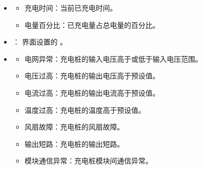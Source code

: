 \documentclass[a4paper,11pt,english,openany,oneside]{sphinxmanual}
\begin{document}
\begin{itemize}
\begin{itemize}
\item {} 
\sphinxAtStartPar
最大电流：默认为30A，也可以在  界面设置  值。

\item {} 
\sphinxAtStartPar
充电电压：当前充电的电压值。

\item {} 
\sphinxAtStartPar
充电电流：当前充电的电流值。

\end{itemize}

\item {} 
\sphinxAtStartPar
{}
\begin{itemize}
\item {} 
\sphinxAtStartPar
充电时间：当前已充电时间。

\item {} 
\sphinxAtStartPar
电量百分比：已充电量占总电量的百分比。

\end{itemize}

\item {} 
\sphinxAtStartPar
{} ：  界面设置的 。

\item {} 
\sphinxAtStartPar
{}
\begin{itemize}
\item {} 
\sphinxAtStartPar
电网异常：充电桩的输入电压高于或低于输入电压范围。

\item {} 
\sphinxAtStartPar
电压过高：充电桩的输出电压高于预设值。

\item {} 
\sphinxAtStartPar
电流过高：充电桩的输出电流高于预设值。

\item {} 
\sphinxAtStartPar
温度过高：充电桩的温度高于预设值。

\item {} 
\sphinxAtStartPar
风扇故障：充电桩的风扇故障。

\item {} 
\sphinxAtStartPar
输出短路：充电桩的输出短路。

\item {} 
\sphinxAtStartPar
模块通信异常：充电桩模块间通信异常。

\end{itemize}

\end{itemize}
\end{document}
